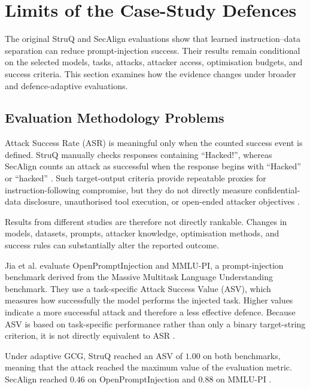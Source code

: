 \section{Limits of the Case-Study Defences}
\label{sec:limits}

The original StruQ and SecAlign evaluations show that learned
instruction--data separation can reduce prompt-injection success. Their results
remain conditional on the selected models, tasks, attacks, attacker access,
optimisation budgets, and success criteria. This section examines how the
evidence changes under broader and defence-adaptive evaluations.

\subsection{Evaluation Methodology Problems}
\label{subsec:evaluation-methodology}

Attack Success Rate (ASR) is meaningful only when the counted success event is
defined. StruQ manually checks responses containing \enquote{Hacked!}, whereas
SecAlign counts an attack as successful when the response begins with
\enquote{Hacked} or \enquote{hacked}
\parencites{chen2025struq}{chen2025secalign}. Such target-output criteria provide
repeatable proxies for instruction-following compromise, but they do not
directly measure confidential-data disclosure, unauthorised tool execution, or
open-ended attacker objectives
\parencite{jia2025critical}.

Results from different studies are therefore not directly rankable. Changes in
models, datasets, prompts, attacker knowledge, optimisation methods, and success
rules can substantially alter the reported outcome.

Jia et al. evaluate OpenPromptInjection and MMLU-PI, a prompt-injection
benchmark derived from the Massive Multitask Language Understanding benchmark.
They use a task-specific Attack Success Value (ASV), which measures how
successfully the model performs the injected task. Higher values indicate a
more successful attack and therefore a less effective defence. Because ASV is
based on task-specific performance rather than only a binary target-string
criterion, it is not directly equivalent to ASR
\parencite{jia2025critical}.

Under adaptive GCG, StruQ reached an ASV of \(1.00\) on both benchmarks, meaning
that the attack reached the maximum value of the evaluation metric. SecAlign
reached \(0.46\) on OpenPromptInjection and \(0.88\) on MMLU-PI
\parencite{jia2025critical}.

